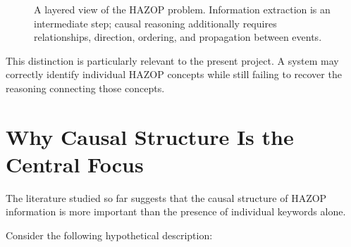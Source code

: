 \begin{figure}[htbp]
\centering
{}
\caption[Layered view of automated HAZOP reasoning]
{A layered view of the HAZOP problem. Information extraction is an
intermediate step; causal reasoning additionally requires relationships,
direction, ordering, and propagation between events.}
\label{fig:w3-layered-problem}
\end{figure}

This distinction is particularly relevant to the present project. A system
may correctly identify individual HAZOP concepts while still failing to
recover the reasoning connecting those concepts.

\section{Why Causal Structure Is the Central Focus}

The literature studied so far suggests that the causal structure of HAZOP
information is more important than the presence of individual keywords alone.

Consider the following hypothetical description:

